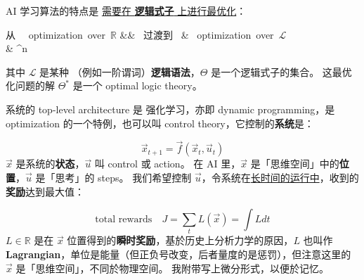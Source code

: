 \documentclass[12pt, orivec]{article}
\newcommand{\cc}[2]{#1}
\newcommand{\cc}[2]{#2}
\begin{document}
\cc{AI 学习算法的特点是 \uline{需要在 }\textbf{\uline{ 逻辑式子}}\uline{ 上进行最优化}：
}{
What is special about an AI learning algorithm is that \uline{it performs optimization over }\textbf{\uline{ logic formulas}} instead of the usual $\mathbb{R}^n$:}
\begin{tcolorbox}[ams align, colback=yellow, colframe=white]
\cc{
\mbox{从 } \mbox{ optimization over $\mathbb{R}$} && \mbox{ 过渡到 } & \mbox{ optimization over $\mathscr{L}$} \nonumber\\
}{
& \mbox{Passage from optimization over $\mathbb{R}$} \mbox{ to optimization over $\mathscr{L}$} \nonumber\\
}
& \quad \quad \quad \quad \Theta \in {}^n \quad \rightsquigarrow \quad \Theta \in {}
\end{tcolorbox}
\cc{其中 $\mathscr{L}$ 是某种 （例如一阶谓词）\textbf{逻辑语法}，$\Theta$ 是一个逻辑式子的集合。 这最优化问题的解 $\Theta^*$ 是一个 optimal logic theory。
}{
Where $\mathscr{L}$ is some kind of (\textit{eg} first-order predicate) \textbf{logical syntax}, and $\Theta$ is a set of logic formulas.  The solution to this optimization problem $\Theta^*$ is an optimal logic theory.}

\cc{系统的 top-level architecture 是 强化学习，亦即 dynamic programming，是 optimization 的一个特例，也可以叫 control theory，它控制的\textbf{系统}是：
}{
The top-level architecture of the system is reinforcement learning, a.k.a. dynamic programming. It is a special case of optimization. It can also be called control theory. The \textbf{system} it controls is:}
\begin{equation}
\vec{x}_{t+1} = \vec{f}( \vec{x}_t, \vec{u}_t )
\end{equation}
\cc{$\vec{x}$ 是系统的\textbf{状态}，$\vec{u}$ 叫 control 或 action。 在 AI 里，$\vec{x}$ 是「思维空间」中的\textbf{位置}，$\vec{u}$ 是「思考」的 steps。 我们希望控制 $\vec{u}$，令系统在\uline{长时间的运行中}，收到的\textbf{奖励}达到最大值： 
}{
$\vec{x}$ is the system's \textbf{state}, $\vec{u}$ is called the \textbf{control} or action. In AI, $\vec{x}$ is the \textbf{position} in ``cognitive space'', and $\vec{u}$ is the ``thinking'' steps. We want to control $\vec{u}$ so that the system reaches the maximum value of \textbf{rewards} \uline{over the long run}:}
\begin{equation}
\boxed{\mbox{total rewards}} \quad J = \sum_t L(\vec{x}) = \int L dt
\end{equation}
\cc{$L \in \mathbb{R}$ 是在 $\vec{x}$ 位置得到的\textbf{瞬时奖励}，基於历史上分析力学的原因，$L$ 也叫作 \textbf{Lagrangian}，单位是能量（但正负号改变，后者量度的是惩罚），但注意这里的 $\vec{x}$ 是「思维空间」，不同於物理空间。 我附带写上微分形式，以便於记忆。
}{
where $L \in \mathbb{R}$ is the \textbf{instantaneous reward} at position $\vec{x}$.  Due to historical reasons (from analytic mechanics), $L$ is called the \textbf{Lagrangian}, its unit is energy (but the sign is reversed, now it measures the penalty), and note that $\vec{x}$ is in ``cognitive space'' which is not the same as physical space.  I prefer to write the differential version as it is easier to remember.}
\end{document}
